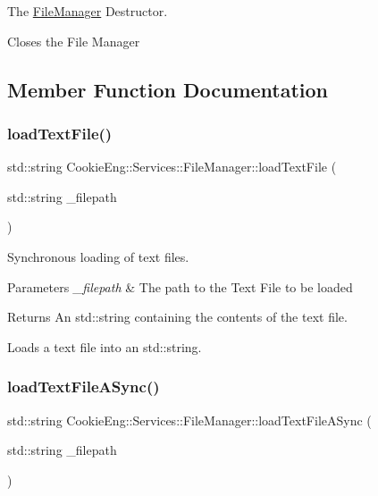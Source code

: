 The \hyperlink{class_cookie_eng_1_1_services_1_1_file_manager}{File\+Manager} Destructor. 

Closes the File Manager 

\subsection{Member Function Documentation}
\mbox{\label{class_cookie_eng_1_1_services_1_1_file_manager_a744bde422e66fcfbfcc379a21ae90500}} 
\subsubsection{\texorpdfstring{load\+Text\+File()}{loadTextFile()}}
{\footnotesize\ttfamily std\+::string Cookie\+Eng\+::\+Services\+::\+File\+Manager\+::load\+Text\+File (\begin{DoxyParamCaption}\item[{std\+::string}]{\+\_\+filepath }\end{DoxyParamCaption})}



Synchronous loading of text files. 


\begin{DoxyParams}{Parameters}
{\em \+\_\+filepath} & The path to the Text File to be loaded \\
\hline
\end{DoxyParams}
\begin{DoxyReturn}{Returns}
An std\+::string containing the contents of the text file.
\end{DoxyReturn}
Loads a text file into an std\+::string. \mbox{\label{class_cookie_eng_1_1_services_1_1_file_manager_abf50a7b6eb9fa88a9557254acbd2d9cc}} 
\subsubsection{\texorpdfstring{load\+Text\+File\+A\+Sync()}{loadTextFileASync()}}
{\footnotesize\ttfamily std\+::string Cookie\+Eng\+::\+Services\+::\+File\+Manager\+::load\+Text\+File\+A\+Sync (\begin{DoxyParamCaption}\item[{std\+::string}]{\+\_\+filepath }\end{DoxyParamCaption})\hspace{0.3cm}{\ttfamily [inline]}}



